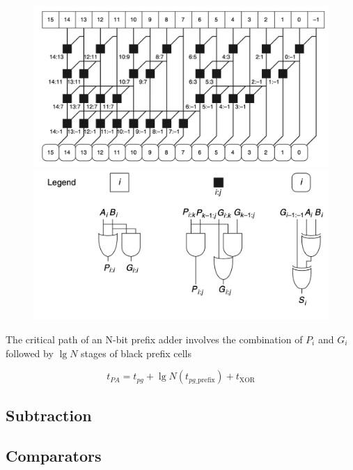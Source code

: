 \documentclass[12pt]{report}
\begin{document}
\begin{figure}[h!]
  \centering
  \includegraphics[width=.7\textwidth]{prefix_adder_schematic.png}
  \includegraphics[width=.7\textwidth]{prefix_schematic_legend.png}
\end{figure}

The critical path of an N-bit prefix adder involves the combination of $P_i$ and $G_i$ followed by $\lg N$ stages of black prefix cells

\[
  t_{PA} = t_{pg} + \lg N \left( t_{pg \_ \mathrm{prefix}} \right) + t_{\mathrm{XOR}}
\]
\pagebreak

\subsection{Subtraction}

\subsection{Comparators}
\purple{
  

}
\end{document}
